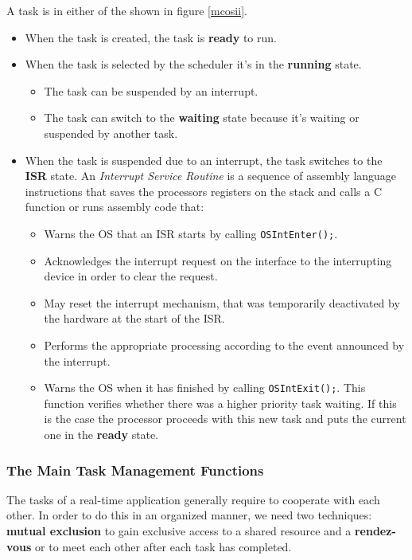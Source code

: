 \documentclass[../main.tex]{subfiles}
\begin{document}
A task is in either of the  shown in figure \ref{mcosii}.
\begin{itemize}
	\item When the task is created, the task is \textbf{ready} to run.
	\item When the task is selected by the scheduler it's in the \textbf{running} state.
	\begin{itemize}
		\item The task can be suspended by an interrupt.
		\item The task can switch to the \textbf{waiting} state because it's waiting or suspended by another task.
	\end{itemize}
	\item When the task is suspended due to an interrupt, the task switches to the \textbf{ISR} state. An \textit{Interrupt Service Routine} is a sequence of assembly language instructions that saves the processors registers on the stack and calls a C function or runs assembly code that:
	\begin{itemize}
	\item Warns the OS that an ISR starts by calling \texttt{OSIntEnter();}.
	\item Acknowledges the interrupt request on the interface to the interrupting device in order to clear the request.
	\item May reset the interrupt mechanism, that was temporarily deactivated by the hardware at the start of the ISR.
	\item Performs the appropriate processing according to the event announced by the interrupt.
	\item Warns the OS when it has finished by calling \texttt{OSIntExit();}. This function verifies whether there was a  higher priority task waiting. If this is the case the processor proceeds with this new task and puts the current one in the \textbf{ready} state.
	\end{itemize}
\end{itemize}

\subsubsection{The Main Task Management Functions}
The tasks of a real-time application generally require to cooperate with each other.
In order to do this in an organized manner, we need two techniques:  \textbf{mutual exclusion} to gain exclusive access to a shared resource and a \textbf{rendez-vous} or  to meet each other after each task has completed.
\end{document}
